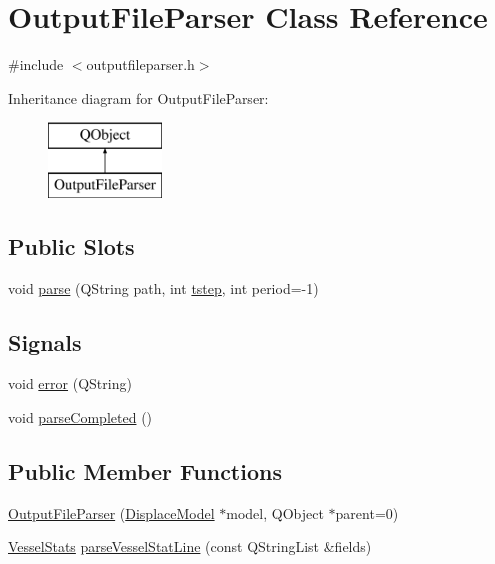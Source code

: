 \hypertarget{class_output_file_parser}{}\section{Output\+File\+Parser Class Reference}
\label{class_output_file_parser}


{\ttfamily \#include $<$outputfileparser.\+h$>$}

Inheritance diagram for Output\+File\+Parser\+:\begin{figure}[H]
\begin{center}
\leavevmode
\includegraphics[height=2.000000cm]{d2/dbb/class_output_file_parser}
\end{center}
\end{figure}
\subsection*{Public Slots}
\begin{DoxyCompactItemize}
\item 
void \mbox{\hyperlink{class_output_file_parser_add4bf39a2cd885b36495c9a3a1b109ba}{parse}} (Q\+String path, int \mbox{\hyperlink{thread__vessels_8cpp_a84bc73d278de929ec9974e1a95d9b23a}{tstep}}, int period=-\/1)
\end{DoxyCompactItemize}
\subsection*{Signals}
\begin{DoxyCompactItemize}
\item 
void \mbox{\hyperlink{class_output_file_parser_a947aea98f88da9fefba1fdeb71a1b57b}{error}} (Q\+String)
\item 
void \mbox{\hyperlink{class_output_file_parser_afad47e50fb7d679046877805e5516a04}{parse\+Completed}} ()
\end{DoxyCompactItemize}
\subsection*{Public Member Functions}
\begin{DoxyCompactItemize}
\item 
\mbox{\hyperlink{class_output_file_parser_a9ed11e913211e4cc4d715127b79a7458}{Output\+File\+Parser}} (\mbox{\hyperlink{class_displace_model}{Displace\+Model}} $\ast$model, Q\+Object $\ast$parent=0)
\item 
\mbox{\hyperlink{class_vessel_stats}{Vessel\+Stats}} \mbox{\hyperlink{class_output_file_parser_a90b3909781062af06d5602038cffcffe}{parse\+Vessel\+Stat\+Line}} (const Q\+String\+List \&fields)
\end{DoxyCompactItemize}

